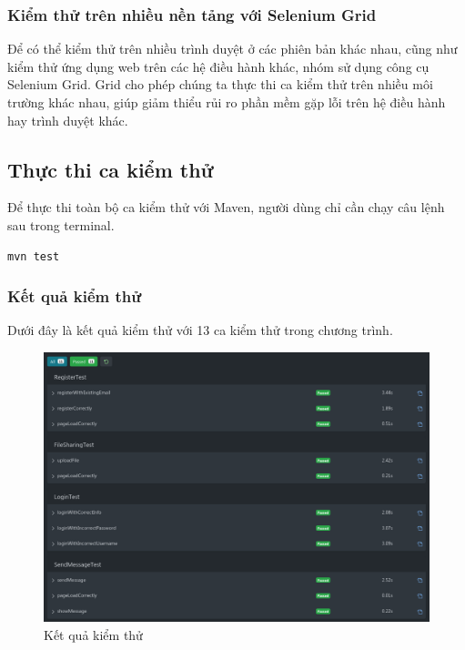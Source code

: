 \documentclass[./../main_file.tex]{subfiles}
\begin{document}
	\subsubsection{Kiểm thử trên nhiều nền tảng với Selenium Grid}

	Để có thể kiểm thử trên nhiều trình duyệt ở các phiên bản khác nhau, cũng như kiểm thử ứng dụng web trên các hệ điều hành khác, nhóm sử dụng công cụ Selenium Grid. Grid cho phép chúng ta thực thi ca kiểm thử trên nhiều môi trường khác nhau, giúp giảm thiểu rủi ro phần mềm gặp lỗi trên hệ điều hành hay trình duyệt khác.
	
	\subsection{Thực thi ca kiểm thử}
	
	Để thực thi toàn bộ ca kiểm thử với Maven, người dùng chỉ cần chạy câu lệnh sau trong terminal.
	
	\begin{lstlisting}[caption=Chạy toàn bộ ca kiểm thử]
		mvn test
	\end{lstlisting}
	
	\subsubsection{Kết quả kiểm thử}
	
	Dưới đây là kết quả kiểm thử với 13 ca kiểm thử trong chương trình.
	
	\begin{figure}[H]
		\centering
		\includegraphics[width=\linewidth]{./images/image6.png}
		\caption{Kết quả kiểm thử}
	\end{figure}
\end{document}
